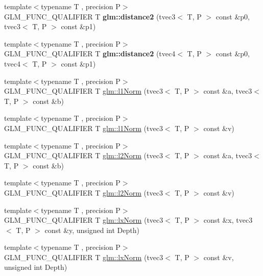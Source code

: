 \begin{DoxyCompactItemize}
\item 
\hypertarget{namespaceglm_a077e15621363b18b4366bc24701c6460}{{\footnotesize template$<$typename T , precision P$>$ }\\G\-L\-M\-\_\-\-F\-U\-N\-C\-\_\-\-Q\-U\-A\-L\-I\-F\-I\-E\-R T {\bfseries glm\-::distance2} (tvec3$<$ T, P $>$ const \&p0, tvec3$<$ T, P $>$ const \&p1)}\label{namespaceglm_a077e15621363b18b4366bc24701c6460}

\item 
\hypertarget{namespaceglm_a2d7dc34ce8ec9c16e32470833b3b1c35}{{\footnotesize template$<$typename T , precision P$>$ }\\G\-L\-M\-\_\-\-F\-U\-N\-C\-\_\-\-Q\-U\-A\-L\-I\-F\-I\-E\-R T {\bfseries glm\-::distance2} (tvec4$<$ T, P $>$ const \&p0, tvec4$<$ T, P $>$ const \&p1)}\label{namespaceglm_a2d7dc34ce8ec9c16e32470833b3b1c35}

\item 
{\footnotesize template$<$typename T , precision P$>$ }\\G\-L\-M\-\_\-\-F\-U\-N\-C\-\_\-\-Q\-U\-A\-L\-I\-F\-I\-E\-R T \hyperlink{group__gtx__norm_gaebe5a39b06e262e615622129f37da4f4}{glm\-::l1\-Norm} (tvec3$<$ T, P $>$ const \&a, tvec3$<$ T, P $>$ const \&b)
\item 
{\footnotesize template$<$typename T , precision P$>$ }\\G\-L\-M\-\_\-\-F\-U\-N\-C\-\_\-\-Q\-U\-A\-L\-I\-F\-I\-E\-R T \hyperlink{group__gtx__norm_ga6d5964f09cdb43803496a5ee3ced71cb}{glm\-::l1\-Norm} (tvec3$<$ T, P $>$ const \&v)
\item 
{\footnotesize template$<$typename T , precision P$>$ }\\G\-L\-M\-\_\-\-F\-U\-N\-C\-\_\-\-Q\-U\-A\-L\-I\-F\-I\-E\-R T \hyperlink{group__gtx__norm_gafa6fbbc99cd44d81bf030e74eaf7ad64}{glm\-::l2\-Norm} (tvec3$<$ T, P $>$ const \&a, tvec3$<$ T, P $>$ const \&b)
\item 
{\footnotesize template$<$typename T , precision P$>$ }\\G\-L\-M\-\_\-\-F\-U\-N\-C\-\_\-\-Q\-U\-A\-L\-I\-F\-I\-E\-R T \hyperlink{group__gtx__norm_ga0a8cb8a0ce88d1d977de23209bf04610}{glm\-::l2\-Norm} (tvec3$<$ T, P $>$ const \&v)
\item 
{\footnotesize template$<$typename T , precision P$>$ }\\G\-L\-M\-\_\-\-F\-U\-N\-C\-\_\-\-Q\-U\-A\-L\-I\-F\-I\-E\-R T \hyperlink{group__gtx__norm_ga932bb0854e5c5a6ab5a14b023c451ca7}{glm\-::lx\-Norm} (tvec3$<$ T, P $>$ const \&x, tvec3$<$ T, P $>$ const \&y, unsigned int Depth)
\item 
{\footnotesize template$<$typename T , precision P$>$ }\\G\-L\-M\-\_\-\-F\-U\-N\-C\-\_\-\-Q\-U\-A\-L\-I\-F\-I\-E\-R T \hyperlink{group__gtx__norm_gaab931b0d1acfe2f9c1cb78311edf24fc}{glm\-::lx\-Norm} (tvec3$<$ T, P $>$ const \&v, unsigned int Depth)
\end{DoxyCompactItemize}


